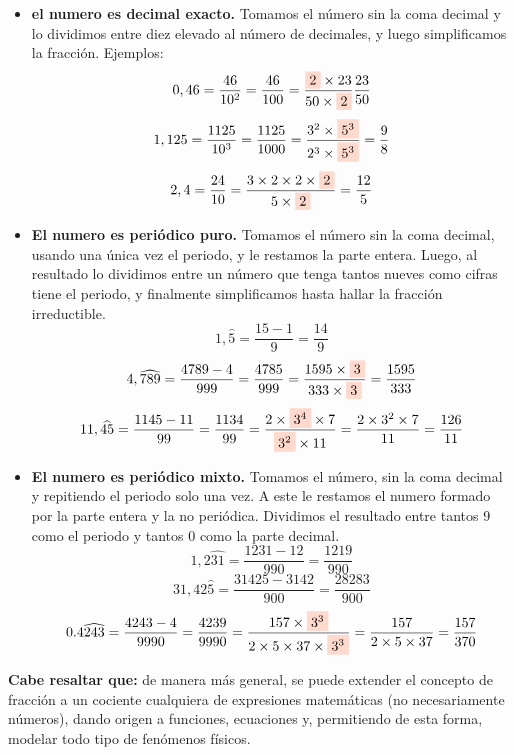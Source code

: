     \begin{itemize}
        \item \textbf{el numero es decimal exacto.} Tomamos el número sin la
            coma decimal y lo dividimos entre diez elevado al número de
            decimales, y luego simplificamos la fracción. Ejemplos:
            $$0,46 = \frac{46}{10^2}=\frac{46}{100}=\frac{ \colorbox{RojoClaro}{2}\times 23}{50\times \colorbox{RojoClaro}{2}}  \frac{23}{50} $$
            $$1,125 = \frac{1125}{10^3}=\frac{1125}{1000}=\frac{3^2\times\colorbox{RojoClaro}{$5^3$}}{2^3\times\colorbox{RojoClaro}{$5^3$}}=\frac{9}{8} $$
            $$2,4=\frac{24}{10}= \frac{3\times2\times2\times \colorbox{RojoClaro}{2}}{5\times \colorbox{RojoClaro}{2}} = \frac{12}{5}$$


        \item \textbf{El numero es periódico puro.}  Tomamos el número sin la coma
            decimal, usando una única vez el periodo, y le restamos la parte
            entera. Luego, al resultado lo dividimos entre un número que tenga
            tantos nueves como cifras tiene el periodo, y finalmente
            simplificamos hasta hallar la fracción irreductible.
            $$1,\widehat{5} =\frac{15-1}{9} =\frac{14}{9} $$
            $$ 4,\widehat{789}=\frac{4789-4}{999} =\frac{4785}{999}=\frac{1595\times \colorbox{RojoClaro}{3}}{333\times \colorbox{RojoClaro}{3}} = \frac{1595}{333} $$
            $$ 11,\widehat{45}=\frac{1145-11}{99}=\frac{1134}{99}=\frac{2\times \colorbox{RojoClaro}{$3^4$}\times7}{ \colorbox{RojoClaro}{$3^2$}\times 11} =\frac{2\times3^2\times7}{11} =\frac{126}{11}$$

        \item \textbf{El numero es periódico mixto.} Tomamos el número, sin la coma
            decimal y repitiendo el periodo solo una vez.
            A este le restamos el numero formado por la parte entera y la no periódica.
            Dividimos el resultado entre tantos 9 como el periodo y tantos 0 como
            la parte decimal.
            $$1,2\widehat{31} = \frac{1231-12}{990}= \frac{1219}{990} $$
            $$31,42\widehat{5}=\frac{31425-3142}{900} =\frac{28283}{900} $$
            $$0.4\widehat{243}=\frac{4243-4}{9990}=\frac{4239}{9990} =\frac{157\times \colorbox{RojoClaro}{$3^3$}}{2\times5\times37\times \colorbox{RojoClaro}{$3^3$}}= \frac{157}{2\times5\times37}= \frac{157}{370} $$
    \end{itemize}




\textbf{Cabe resaltar que:} de manera más general, se puede extender el
concepto de fracción a un cociente
cualquiera de expresiones matemáticas (no necesariamente números), dando origen a
funciones, ecuaciones y, permitiendo de esta forma, modelar todo tipo de
fenómenos físicos.



